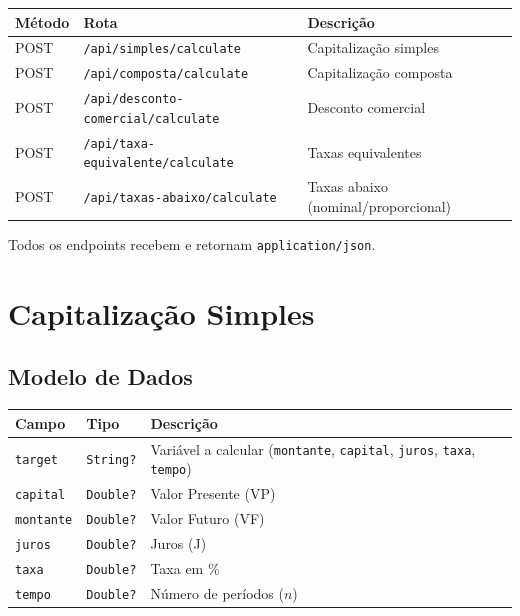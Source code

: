 \documentclass[12pt,a4paper]{article}
\begin{document}
\begin{center}
\begin{tabular}{llp{6.5cm}}
  \toprule
  \textbf{Método} & \textbf{Rota} & \textbf{Descrição} \\
  \midrule
  POST & \texttt{/api/simples/calculate}            & Capitalização simples \\
  POST & \texttt{/api/composta/calculate}            & Capitalização composta \\
  POST & \texttt{/api/desconto-comercial/calculate}  & Desconto comercial \\
  POST & \texttt{/api/taxa-equivalente/calculate}     & Taxas equivalentes \\
  POST & \texttt{/api/taxas-abaixo/calculate}         & Taxas abaixo (nominal/proporcional) \\
  \bottomrule
\end{tabular}
\end{center}

Todos os endpoints recebem e retornam \texttt{application/json}.

\section{Capitalização Simples}
\label{sec:simples}

\subsection{Modelo de Dados}

\begin{center}
\begin{tabular}{llp{6.5cm}}
  \toprule
  \textbf{Campo} & \textbf{Tipo} & \textbf{Descrição} \\
  \midrule
  \texttt{target}   & \texttt{String?} & Variável a calcular (\texttt{montante}, \texttt{capital}, \texttt{juros}, \texttt{taxa}, \texttt{tempo}) \\
  \texttt{capital}  & \texttt{Double?} & Valor Presente (VP) \\
  \texttt{montante} & \texttt{Double?} & Valor Futuro (VF) \\
  \texttt{juros}    & \texttt{Double?} & Juros (J) \\
  \texttt{taxa}     & \texttt{Double?} & Taxa em \% \\
  \texttt{tempo}    & \texttt{Double?} & Número de períodos ($n$) \\
  \bottomrule
\end{tabular}
\end{center}
\end{document}
